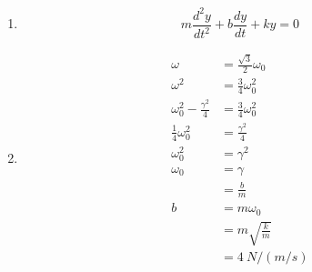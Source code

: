 \documentclass{article}
\begin{document}
\setcounter{subsection}{13}
\subsection{}

\begin{enumerate}
  \item \[m \frac{d^2 y}{d t^2} + b \frac{d y}{d t} + k y = 0\]

  \item

        \begin{align*}
          \omega                          & = \frac{\sqrt{3}}{2} \omega_0 \\
          \omega^2                        & = \frac{3}{4} \omega_0^2      \\
          \omega_0^2 - \frac{\gamma^2}{4} & = \frac{3}{4} \omega_0^2      \\
          \frac{1}{4} \omega_0^2          & = \frac{\gamma^2}{4}          \\
          \omega_0^2                      & = \gamma^2                    \\
          \omega_0                        & = \gamma                      \\
                                          & = \frac{b}{m}                 \\
          b                               & = m \omega_0                  \\
                                          & = m \sqrt{\frac{k}{m}}        \\
                                          & = \qty{4}{N/(m/s)}
        \end{align*}
\end{enumerate}

\subsection{}
\end{document}
